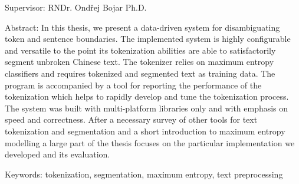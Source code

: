 {\begin{singlespace}
Supervisor:
RNDr. Ondřej Bojar Ph.D.

Abstract:
In this thesis, we present a data-driven system for disambiguating token and
sentence boundaries. The implemented system is highly configurable and
versatile to the point its tokenization abilities are able to satisfactorily
segment unbroken Chinese text. The tokenizer relies on maximum entropy
classifiers and requires tokenized and segmented text as training data. The
program is accompanied by a tool for reporting the performance of the
tokenization which helps to rapidly develop and tune the tokenization process. The
system was built with multi-platform libraries only and with emphasis on speed
and correctness. After a necessary survey of other tools for text tokenization
and segmentation and a short introduction to maximum entropy modelling a large
part of the thesis focuses on the particular implementation we developed and
its evaluation.

Keywords:
tokenization, segmentation, maximum entropy, text preprocessing

\end{singlespace}

\vss}

\newpage
